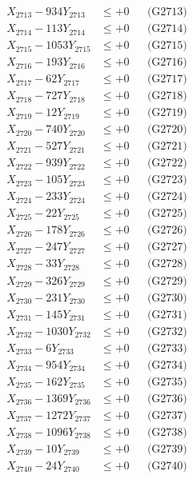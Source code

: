 \documentclass[a4paper,10pt]{article}
\begin{document}
{\begin{align}
X_{2713} - 934Y_{2713} &\leq +0 && \text{(G2713)} \\
X_{2714} - 113Y_{2714} &\leq +0 && \text{(G2714)} \\
X_{2715} - 1053Y_{2715} &\leq +0 && \text{(G2715)} \\
X_{2716} - 193Y_{2716} &\leq +0 && \text{(G2716)} \\
X_{2717} - 62Y_{2717} &\leq +0 && \text{(G2717)} \\
X_{2718} - 727Y_{2718} &\leq +0 && \text{(G2718)} \\
X_{2719} - 12Y_{2719} &\leq +0 && \text{(G2719)} \\
X_{2720} - 740Y_{2720} &\leq +0 && \text{(G2720)} \\
\allowbreak
X_{2721} - 527Y_{2721} &\leq +0 && \text{(G2721)} \\
X_{2722} - 939Y_{2722} &\leq +0 && \text{(G2722)} \\
X_{2723} - 105Y_{2723} &\leq +0 && \text{(G2723)} \\
X_{2724} - 233Y_{2724} &\leq +0 && \text{(G2724)} \\
X_{2725} - 22Y_{2725} &\leq +0 && \text{(G2725)} \\
X_{2726} - 178Y_{2726} &\leq +0 && \text{(G2726)} \\
X_{2727} - 247Y_{2727} &\leq +0 && \text{(G2727)} \\
X_{2728} - 33Y_{2728} &\leq +0 && \text{(G2728)} \\
X_{2729} - 326Y_{2729} &\leq +0 && \text{(G2729)} \\
X_{2730} - 231Y_{2730} &\leq +0 && \text{(G2730)} \\
\allowbreak
X_{2731} - 145Y_{2731} &\leq +0 && \text{(G2731)} \\
X_{2732} - 1030Y_{2732} &\leq +0 && \text{(G2732)} \\
X_{2733} - 6Y_{2733} &\leq +0 && \text{(G2733)} \\
X_{2734} - 954Y_{2734} &\leq +0 && \text{(G2734)} \\
X_{2735} - 162Y_{2735} &\leq +0 && \text{(G2735)} \\
X_{2736} - 1369Y_{2736} &\leq +0 && \text{(G2736)} \\
X_{2737} - 1272Y_{2737} &\leq +0 && \text{(G2737)} \\
X_{2738} - 1096Y_{2738} &\leq +0 && \text{(G2738)} \\
X_{2739} - 10Y_{2739} &\leq +0 && \text{(G2739)} \\
X_{2740} - 24Y_{2740} &\leq +0 && \text{(G2740)} \\

\end{align}}
\end{document}
